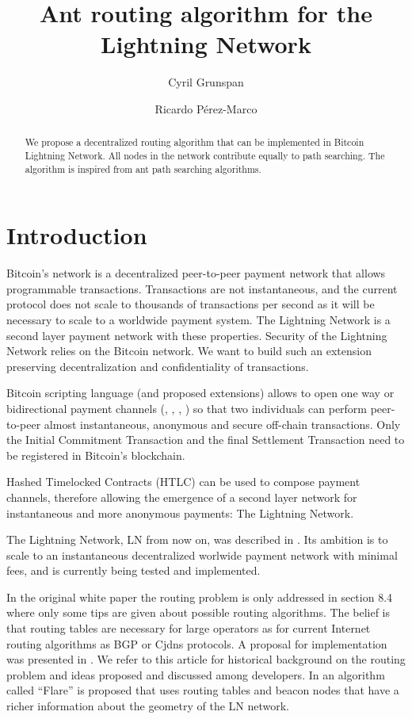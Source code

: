 \documentclass[12pt]{amsart}
\title{Ant routing algorithm for the Lightning Network}
\author[C. Grunspan]{Cyril Grunspan}
\author[R. P\'{e}rez-Marco]{Ricardo P\'{e}rez-Marco}
\theoremstyle{remark}
\begin{document}
\begin{abstract}
  We propose a decentralized routing algorithm that can be implemented in Bitcoin Lightning Network. 
  All nodes in the network contribute equally to path searching. The algorithm is inspired from  
  ant path searching algorithms.
\end{abstract}

{\maketitle}

\section{Introduction}

Bitcoin's network is a decentralized peer-to-peer payment network \cite{N08} that allows programmable 
transactions. Transactions are not instantaneous, and the 
current protocol does not scale to thousands of transactions per second as it will be necessary 
to scale to a worldwide payment system. The Lightning Network is a second layer payment network with 
these properties. Security of the Lightning Network relies on the Bitcoin network. We want to build such 
an extension preserving decentralization and confidentiality of transactions.

\medskip


Bitcoin scripting language (and proposed extensions) allows to open one way or bidirectional 
payment channels (\cite{DW15}, \cite{HS15}, \cite{PD15}, \cite{DOR18})  so that 
two individuals can perform peer-to-peer
almost instantaneous, anonymous and secure off-chain transactions. 
Only the Initial Commitment Transaction and the final Settlement Transaction need to be 
registered in Bitcoin's blockchain. 

\medskip

Hashed Timelocked Contracts (HTLC) can be used to compose payment channels, therefore 
allowing the emergence of a second layer 
network for instantaneous and more anonymous payments: The Lightning Network. 

\medskip

The Lightning Network, LN from now on, was described in  \cite{PD15}. 
Its ambition is to scale to an instantaneous decentralized worlwide payment network with minimal fees, and 
is currently being tested and implemented.


In the original white paper \cite{PD15} the routing problem is only addressed  
in section 8.4 where only some tips are given about possible routing algorithms.
The belief is that routing tables are necessary for large operators as for current Internet routing 
algorithms as BGP or Cjdns protocols.
A proposal for implementation was presented in \cite{POOSZ16}. We refer to this article for historical 
background on the routing problem and ideas proposed and discussed among developers. In \cite{POOSZ16}
an algorithm called ``Flare'' is proposed that uses routing tables and beacon nodes that have a 
richer information about the geometry of the LN network.
\end{document}
